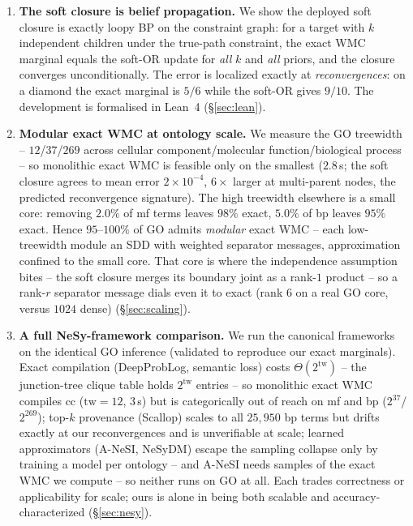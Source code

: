 \documentclass[anon]{nesy2026}
\newcommand{\WMC}{\ensuremath{\mathrm{WMC}}}
\newcommand{\tw}{\ensuremath{\mathrm{tw}}}
\begin{document}
\begin{enumerate}\itemsep2pt
\item \textbf{The soft closure is belief propagation.}
We show the deployed soft closure is exactly loopy BP on the constraint graph: for a target
with $k$ independent children under the true-path constraint, the exact WMC marginal equals
the soft-OR update for \emph{all} $k$ and \emph{all} priors, and the closure converges
unconditionally. The error is localized exactly at \emph{reconvergences}: on a diamond the
exact marginal is $5/6$ while the soft-OR gives $9/10$. The development is formalised in
Lean~4 (\S\ref{sec:lean}).

\item \textbf{Modular exact WMC at ontology scale.}
We measure the GO treewidth -- $12$/$37$/$269$ across cellular component/molecular
function/biological process -- so monolithic exact WMC is feasible only on the smallest
($2.8$\,s; the soft closure agrees to mean error $2\times10^{-4}$, $6\times$ larger at
multi-parent nodes, the predicted reconvergence signature). The high treewidth elsewhere is
a small core: removing $2.0\%$ of mf terms leaves $98\%$ exact, $5.0\%$ of bp leaves $95\%$
exact. Hence $95$--$100\%$ of GO admits \emph{modular} exact WMC -- each low-treewidth module
an SDD with weighted separator messages, approximation confined to the small core. That core
is where the independence assumption bites -- the soft closure merges its boundary joint as a
rank-$1$ product -- so a rank-$r$ separator message dials even it to exact (rank $6$ on a real
GO core, versus $1024$ dense) (\S\ref{sec:scaling}).

\item \textbf{A full NeSy-framework comparison.}
We run the canonical frameworks on the identical GO inference (validated to reproduce our
exact marginals). Exact compilation (DeepProbLog, semantic loss) costs $\Theta(2^{\tw})$ -- the
junction-tree clique table holds $2^{\tw}$ entries -- so monolithic exact WMC compiles cc
($\tw{=}12$, $3$\,s) but is categorically out of reach on mf and bp ($2^{37}$/$2^{269}$);
top-$k$ provenance (Scallop) scales to all $25{,}950$
bp terms but drifts exactly at our reconvergences and is unverifiable at scale;
learned approximators (A-NeSI, NeSyDM) escape the sampling collapse only by training a model per
ontology -- and A-NeSI needs samples of the exact $\WMC$ we compute -- so neither runs on GO at
all. Each trades correctness or applicability for scale; ours
is alone in being both scalable and accuracy-characterized (\S\ref{sec:nesy}).
\end{enumerate}
\end{document}
